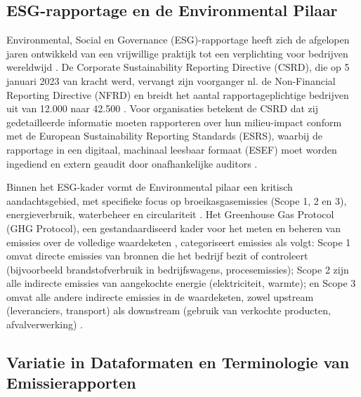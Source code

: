 \subsection{ESG-rapportage en de Environmental Pilaar}

Environmental, Social en Governance (ESG)-rapportage heeft zich de afgelopen jaren ontwikkeld van een vrijwillige praktijk tot een verplichting voor bedrijven wereldwijd \autocite{UNGC}. De Corporate Sustainability Reporting Directive (CSRD), die op 5 januari 2023 van kracht werd, vervangt zijn voorganger nl. de Non-Financial Reporting Directive (NFRD) en breidt het aantal rapportageplichtige bedrijven uit van 12.000 naar 42.500 \autocite{AccountancyEurope2024}. Voor organisaties betekent de CSRD dat zij gedetailleerde informatie moeten rapporteren over hun milieu-impact conform met de European Sustainability Reporting Standards (ESRS), waarbij de rapportage in een digitaal, machinaal leesbaar formaat (ESEF) moet worden ingediend en extern geaudit door onafhankelijke auditors \autocite{EuropeanCommission2024}.

Binnen het ESG-kader vormt de Environmental pilaar een kritisch aandachtsgebied, met specifieke focus op broeikasgasemissies (Scope 1, 2 en 3), energieverbruik, waterbeheer en circulariteit \autocite{AccountancyEurope2024}. Het Greenhouse Gas Protocol (GHG Protocol), een gestandaardiseerd kader voor het meten en beheren van emissies over de volledige waardeketen \autocite{GGP2013}, categoriseert emissies als volgt: Scope 1 omvat directe emissies van bronnen die het bedrijf bezit of controleert (bijvoorbeeld brandstofverbruik in bedrijfswagens, procesemissies); Scope 2 zijn alle indirecte emissies van aangekochte energie (elektriciteit, warmte); en Scope 3 omvat alle andere indirecte emissies in de waardeketen, zowel upstream (leveranciers, transport) als downstream (gebruik van verkochte producten, afvalverwerking) \autocite{Wiedmann2020}. 

\subsection{Variatie in Dataformaten en Terminologie van Emissierapporten}

